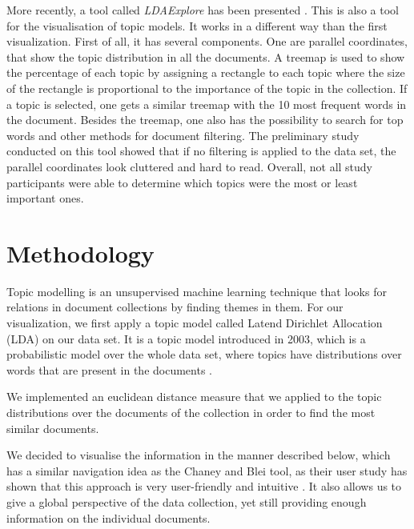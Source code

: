 \documentclass[11pt]{article}
\begin{document}
More recently, a tool called \textit{LDAExplore} has been presented \cite{Ganesan2015LDAExploreVT}. This is also a tool for the visualisation of topic models. It works in a different way than the first visualization. First of all, it has several components. One are parallel coordinates, that show the topic distribution in all the documents. A treemap is used to show the percentage of each topic by assigning a rectangle to each topic where the size of the rectangle is proportional to the importance of the topic in the collection. If a topic is selected, one gets a similar treemap with the 10 most frequent words in the document. Besides the treemap, one also has the possibility to search for top words and other methods for document filtering. The preliminary study conducted on this tool \cite{Ganesan2015LDAExploreVT} showed that if no filtering is applied to the data set, the parallel coordinates look cluttered and hard to read. Overall, not all study participants were able to determine which topics were the most or least important ones.

\section{Methodology}
%

Topic modelling is an unsupervised machine learning technique that looks for relations in document collections by finding themes in them. For our visualization, we first apply a topic model called Latend Dirichlet Allocation (LDA) on our data set. It is a topic model introduced in 2003, which is a probabilistic model over the whole data set, where topics have distributions over words that are present in the documents \cite{Blei03latentdirichlet}.

We implemented an euclidean distance measure that we applied to the topic distributions over the documents of the collection in order to find the most similar documents.

We decided to visualise the information in the manner described below, which has a similar navigation idea as the Chaney and Blei tool, as their user study has shown that this approach is very user-friendly and intuitive \cite{Chaney2012VisualizingTM}. It also allows us to give a global perspective of the data collection, yet still providing enough information on the individual documents.

\end{document}

